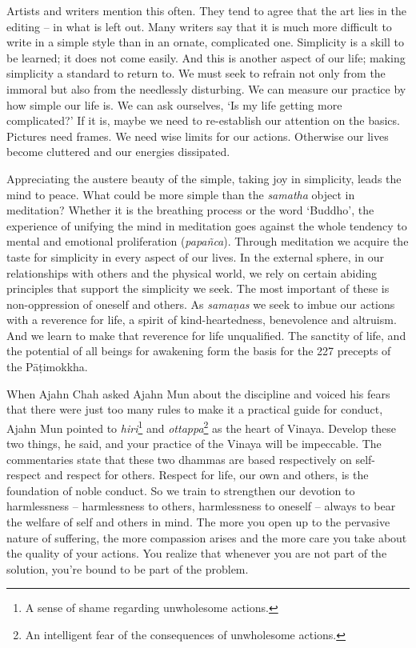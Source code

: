 Artists and writers mention this often. They tend to agree that the art
lies in the editing -- in what is left out. Many writers say that it is
much more difficult to write in a simple style than in an ornate, 
complicated one. Simplicity is a skill to be learned; it does not come
easily. And this is another aspect of our life; making simplicity a
standard to return to. We must seek to refrain not only from the immoral
but also from the needlessly disturbing. We can measure our practice by
how simple our life is. We can ask ourselves, `Is my life getting more
complicated?' If it is, maybe we need to re-establish our attention on
the basics. Pictures need frames. We need wise limits for our actions. 
Otherwise our lives become cluttered and our energies dissipated. 

Appreciating the austere beauty of the simple, taking joy in simplicity, 
leads the mind to peace. What could be more simple than the
\emph{samatha} object in meditation? Whether it is the breathing process
or the word `Buddho', the experience of unifying the mind in meditation
goes against the whole tendency to mental and emotional proliferation
 (\emph{papañca}). Through meditation we acquire the taste for simplicity
in every aspect of our lives. In the external sphere, in our
relationships with others and the physical world, we rely on certain
abiding principles that support the simplicity we seek. The most
important of these is non-oppression of oneself and others. As
\emph{samaṇas} we seek to imbue our actions with a reverence for life, a
spirit of kind-heartedness, benevolence and altruism. And we learn to
make that reverence for life unqualified. The sanctity of life, and the
potential of all beings for awakening form the basis for the 227
precepts of the Pāṭimokkha.

When Ajahn Chah asked Ajahn Mun about the
discipline and voiced his fears that there were just too many rules to
make it a practical guide for conduct, Ajahn Mun pointed to
\emph{hiri}\footnote{A sense of shame regarding unwholesome
actions.} and \emph{ottappa}\footnote{An intelligent fear of
the consequences of unwholesome actions.} as the heart of Vinaya. 
Develop these two things, he said, and your practice of the Vinaya will
be impeccable. The commentaries state that these two dhammas are based
respectively on self-respect and respect for others. Respect for life, 
our own and others, is the foundation of noble conduct. So we train to
strengthen our devotion to harmlessness -- harmlessness to others, 
harmlessness to oneself -- always to bear the welfare of self and
others in mind. The more you open up to the pervasive nature of
suffering, the more compassion arises and the more care you take about
the quality of your actions. You realize that whenever you are not part
of the solution, you're bound to be part of the problem. 

